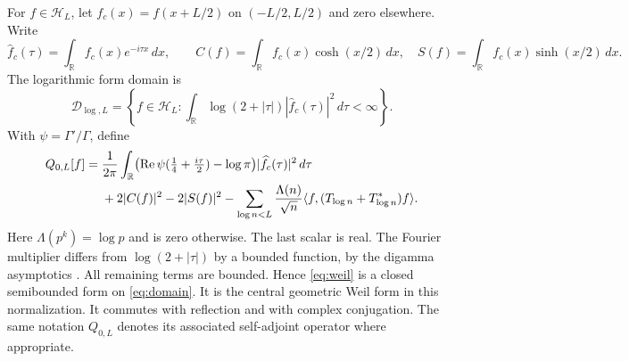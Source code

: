 \documentclass[11pt]{article}
\numberwithin{equation}{section}
\theoremstyle{definition}
\theoremstyle{remark}
\newcommand{\HH}{\mathcal H}
\newcommand{\DD}{\mathcal D}
\newcommand{\RR}{\mathbb R}
\newcommand{\Rea}{\operatorname{Re}}
\newcommand{\ip}[2]{\langle#1,#2\rangle}
\begin{document}
For $f\in\HH_L$, let $f_c(x)=f(x+L/2)$ on $(-L/2,L/2)$ and zero elsewhere.
Write
\[
 \widehat f_c(\tau)=\int_{\RR}f_c(x)e^{-i\tau x}\,dx,\qquad
 C(f)=\int_{\RR}f_c(x)\cosh(x/2)\,dx,\quad
 S(f)=\int_{\RR}f_c(x)\sinh(x/2)\,dx.
\]
The logarithmic form domain is
\begin{equation}\label{eq:domain}
 \DD_{\log,L}=\left\{f\in\HH_L:
 \int_{\RR}\log(2+|\tau|)|\widehat f_c(\tau)|^2\,d\tau<\infty\right\}.
\end{equation}
With $\psi=\Gamma'/\Gamma$, define
\begin{align}
 Q_{0,L}[f]={}&\frac1{2\pi}\int_{\RR}
 \bigl(\Rea\psi(\tfrac14+\tfrac{i\tau}{2})-\log\pi\bigr)
 |\widehat f_c(\tau)|^2\,d\tau\notag\\
 &+2|C(f)|^2-2|S(f)|^2
 -\sum_{\log n<L}\frac{\Lambda(n)}{\sqrt n}
 \ip f{(T_{\log n}+T_{\log n}^*)f}.
 \label{eq:weil}
\end{align}
Here $\Lambda(p^k)=\log p$ and is zero otherwise. The last scalar is real.
The Fourier multiplier differs from $\log(2+|\tau|)$ by a bounded function,
by the digamma asymptotics \cite[\S5.11]{DLMF}. All remaining terms are
bounded. Hence \eqref{eq:weil} is a closed semibounded form on
\eqref{eq:domain}. It is the central geometric Weil form in this normalization.
It commutes with reflection and with complex conjugation. The same notation
$Q_{0,L}$ denotes its associated self-adjoint operator where appropriate.
\end{document}
